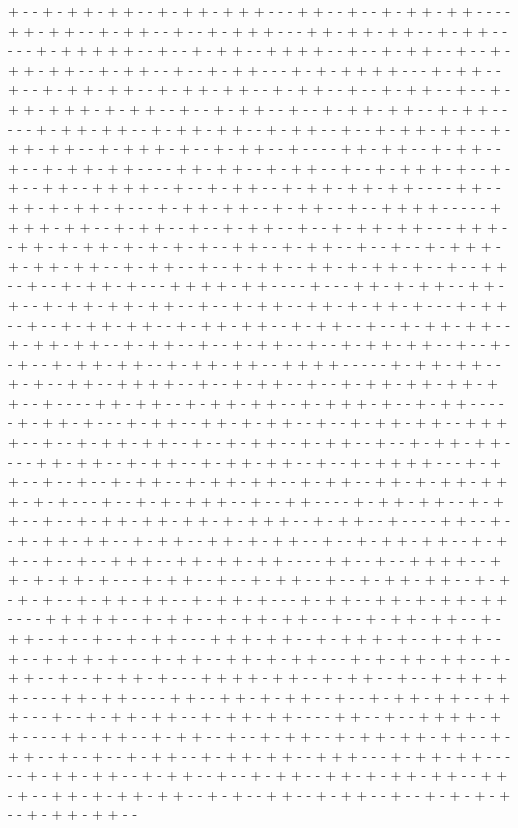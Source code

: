+ - - + - + + - + + - - + - + + - + + + - - - + + - - + - - + - + + - + + - - - - + + - + + - - + - + + - - + - - + - + + + - - - + + - + + - + + - - + - + + - - - - - + - + + + + + - - + - - + - + + - - + + + + - - + - - + - + + - - + - - + - + + - + + - - + - + + - - + - - + - + + - - - + - + - + + + + - - - + - + + - - + - - + - + + - + + - - + - + + - + + - - + - + + - - + - - + - + + - - + - - + - + + - + + + - + - + + - - + - - + - + + - - + - - + - + + - + + - - + - + + - - - - - + - + + - + + - - + - + + - + + - - + - + + - - + - - + - + + - + + - - + - + + - + + - - + - + + + - + - - + - + + - - + - - - - + + - + + - - + - + + - - + - - + - + + - + + - - - - + + - + + - - + - + + - - + - - + - + + + - + - - + - + - - + + - - + + + + - - + - - + - + + - - + - + + - + + - + + - - - - + + - - + + - + - + + - + - - - + - + + - + + - - + - + + - - + - - + + + + - - - - - + + + + - + + - - + - + + - - + - - + - + + - - + - - + - + + - + + - - - + + + - - + + - + - + + - + - + - + - + - - + + - - + - + + - - + - - + - - + - + + + - + - + + - + + - - + - + + - - + - - + - + + - - + + - + - + + - + - - + - - + + - - + - - + - + + - + - - - + + + + - + + - - - - + - - - + + - + - + + - - + + - + - - + - + + - + + - + + - - + - - + - + + - - + + - + - + + - + - - - + - + + - - + - - + - + + - + + - - + - + + - + + - - + - + + - - + - - + - + + - + + - - + - + + - + + - - + - + + - - + - - + - + + - - + - - + - + + - + + - - + - - + - - + - - + - + + - + + - - + - + + - + + - - + + + + - - - - - + - + + - + + - - + - + - - + + - - + + + + - - + - - + - + + - - + - - + - + + - + + - + + - + + - - + - - - - + + - + + - - + - + + - + + - - + - + + + - + - - + - + + - - - - - + - + + - + - - - + - + + - - + + - + - + + - - + - - + - + + - + + - - + + + + - - + - - + - + + - + + - - + - - + - + + - - + - + + - - + - - + - + + - + + - - - - + + - + + - - + - + + - - + - + + - + + - - + - - + - + + + + - - - + - + + - - + - - + - - + - + + - - + - + + - + + - - + - + + - - + + - + - + + - + + + - + - + - - - + - - + - + - + + + - - + - - + + - - - - + - + + - + + - - + - + + - - + - - + - + + - + + - + + - + - + + + - - + - + + - - + - - - - + + - - + - - + - + + - + + - - + - + + - - + + - + - + + - - + - - + - + + - + + - - + - + + - - + - - + - - + + + - - + + - + + - + + - - - - + + - - + - - + + + + - - + + - + - + + - + - - - + - + + - - + - - + - + + - - + - - + - + + - + + - - + - + - + - + - - + - + + - + + - - + - + + - + - - - + - + + - - + + - + - + + - + + - - - - + + + + + - - + - + + - - + - + + - + + - - + - - + - + + - + + - - + - + + - - + - - + - - + - + + - - - + + + - + + - - + - + + + - + - - + - + + - - + - - + - + + - + - - - + - + + - - + + - + - + + - - - + - + - + + - + + - - + - + + - - + - - + - + + - + - - - + + + + - + + - - + - + + - - + - - + - + + - + + - - - - + + - + + - - - - + + - - + + - + - + + - - + - - + - + + - + + - - + + + - - - + - - + - + + - + + - - + - + + - + + - - - - + + - - + - - + + + + - + + - - - - + + - + + - - + - + + - - + - - + - + + - - + - + + - + + - + + - - + - + + - - + - - + - - + - + + - - + - + + - + + - - + + + - - - + - + + - + + - - - - - + - + + - + + - - + - + + - - + - - + - + + - - + + - + - + + - + + - - + + - + - - + + - + - + + - + + - - + - + - - + + - - + - + + - - + - - + - + - + - + - - + - + + - + + - - 